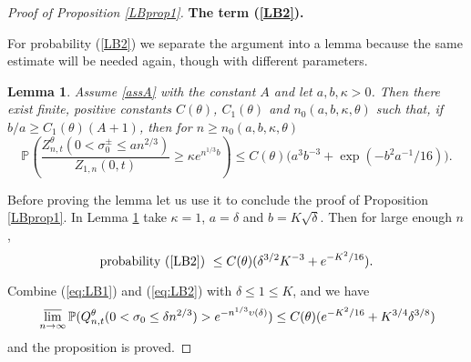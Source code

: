 \documentclass[11pt]{amsart}
\newtheorem{lemma}[theorem]{\sc Lemma}
\numberwithin{equation}{section}
\theoremstyle{remark}
\begin{document}
\begin{proof}[Proof of Proposition \ref{LBprop1}]
\medskip
\noindent \textbf{The term (\ref{LB2}).} 

For  probability  (\ref{LB2}) we separate the argument into a lemma because the
same estimate will be needed again, though with different parameters. 

\begin{lemma} Assume \eqref{assA} with the constant $A$ and let ${a},{b}, \kappa>0$.  
Then there exist finite, positive  
constants $C({\theta})$, $C_1({\theta})$ and  $n_0(a,b,\kappa,{\theta})$ such that, if $b/a\ge C_1({\theta})(A+1)$, then 
for $n\ge n_0(a,b, \kappa, {\theta})$
\[ {\mathbb{P}}\left(\frac{Z^{\theta}_{n,t}( 0< \sigma^\pm_0\le {a} n^{2/3})}{Z_{1,n}(0,t)}\ge \kappa e^{n^{1/3} {b}}\right)
\le  
C({\theta}) \bigl( a^3b^{-3} + \exp(-b^2a^{-1}/16) \bigr).  
  \]
\label{LBlemma3}\end{lemma}

Before proving the lemma let us use it to conclude the proof of Proposition \ref{LBprop1}. 
In Lemma \ref{LBlemma3}  take $\kappa=1$, ${a}=\delta$ and ${b}=K\sqrt\delta$.
 Then for large enough $n$, 
\begin{equation} 
 \text{probability (\ref{LB2}) } \le C({\theta}) (\delta^{3/2}K^{-3}+ e^{-K^2/16}).
\label{eq:LB2}\end{equation}

Combine (\ref{eq:LB1}) and  (\ref{eq:LB2})  with $\delta\le 1\le K$, and we have
\begin{eqnarray}{\nonumber} 
 \varlimsup_{n\to \infty} {\mathbb{P}}(Q^{\theta}_{n,t}(0< \sigma_0\le \delta n^{2/3})>e^{-n^{1/3} \upsilon(\delta)}) 
  \le   C({\theta}) ( e^{-K^2/16}+  K^{3/4} \delta ^{3/8}   )
{\nonumber}
\end{eqnarray} 
and  the proposition is proved.
 \end{proof}
\end{document}
